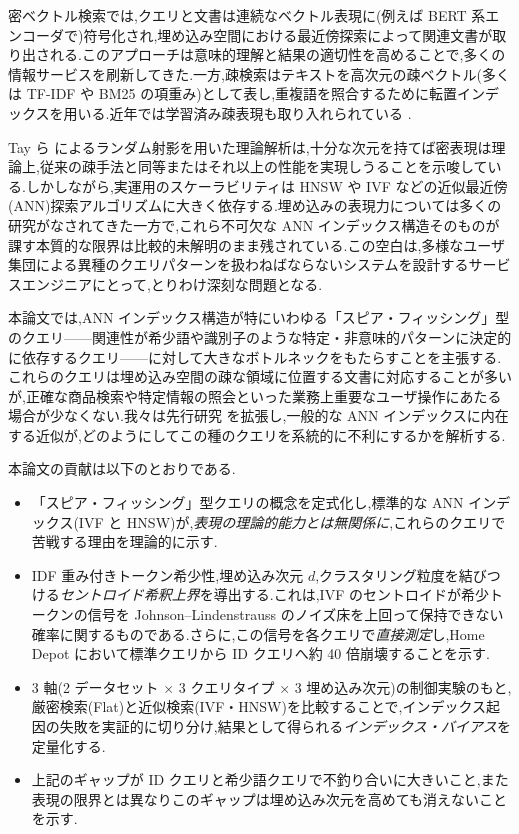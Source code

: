 \documentclass[conference]{IEEEtran}
\begin{document}
密ベクトル検索では,クエリと文書は連続なベクトル表現に(例えば BERT 系エンコーダで)符号化され,埋め込み空間における最近傍探索によって関連文書が取り出される.このアプローチは意味的理解と結果の適切性を高めることで,多くの情報サービスを刷新してきた.一方,疎検索はテキストを高次元の疎ベクトル(多くは TF-IDF や BM25 の項重み)として表し,重複語を照合するために転置インデックスを用いる.近年では学習済み疎表現も取り入れられている \cite{formal2021splade}.

Tay ら \cite{tay2020sparse} によるランダム射影を用いた理論解析は,十分な次元を持てば密表現は理論上,従来の疎手法と同等またはそれ以上の性能を実現しうることを示唆している.しかしながら,実運用のスケーラビリティは HNSW や IVF などの近似最近傍(ANN)探索アルゴリズムに大きく依存する.埋め込みの表現力については多くの研究がなされてきた一方で,これら不可欠な ANN インデックス構造そのものが課す本質的な限界は比較的未解明のまま残されている.この空白は,多様なユーザ集団による異種のクエリパターンを扱わねばならないシステムを設計するサービスエンジニアにとって,とりわけ深刻な問題となる.

本論文では,ANN インデックス構造が特にいわゆる「スピア・フィッシング」型のクエリ——関連性が希少語や識別子のような特定・非意味的パターンに決定的に依存するクエリ——に対して大きなボトルネックをもたらすことを主張する.これらのクエリは埋め込み空間の疎な領域に位置する文書に対応することが多いが,正確な商品検索や特定情報の照会といった業務上重要なユーザ操作にあたる場合が少なくない.我々は先行研究 \cite{tay2020sparse, fan2022information} を拡張し,一般的な ANN インデックスに内在する近似が,どのようにしてこの種のクエリを系統的に不利にするかを解析する.

本論文の貢献は以下のとおりである.
\begin{itemize}
    \item 「スピア・フィッシング」型クエリの概念を定式化し,標準的な ANN インデックス(IVF と HNSW)が,\emph{表現の理論的能力とは無関係に},これらのクエリで苦戦する理由を理論的に示す.

    \item IDF 重み付きトークン希少性,埋め込み次元 $d$,クラスタリング粒度を結びつける\emph{セントロイド希釈上界}を導出する.これは,IVF のセントロイドが希少トークンの信号を Johnson--Lindenstrauss のノイズ床を上回って保持できない確率に関するものである.さらに,この信号を各クエリで\emph{直接測定}し,Home Depot において標準クエリから ID クエリへ約 40 倍崩壊することを示す.

    \item 3 軸(2 データセット $\times$ 3 クエリタイプ $\times$ 3 埋め込み次元)の制御実験のもと,厳密検索(Flat)と近似検索(IVF・HNSW)を比較することで,インデックス起因の失敗を実証的に切り分け,結果として得られる\emph{インデックス・バイアス}を定量化する.

    \item 上記のギャップが ID クエリと希少語クエリで不釣り合いに大きいこと,また表現の限界とは異なりこのギャップは埋め込み次元を高めても消えないことを示す.
\end{itemize}
\end{document}
